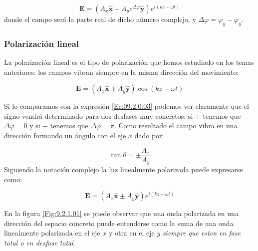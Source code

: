 \documentclass[12pt]{article}
\newcommand{\En}{\mathbf{E}}
\newcommand{\hnx}{\hat{\mathbf{x}}}
\newcommand{\hny}{\hat{\mathbf{y}}}
\numberwithin{equation}{section}
\numberwithin{figure}{section}
\begin{document}
\begin{equation}
\En = ( A_x \hnx +  A_y e^{\Delta \varphi} \hny) e^{i (kz - \omega t)} \label{Ec:09.2.0.03}
\end{equation}
donde el campo será la parte real de dicho número complejo, y $\Delta \varphi = \varphi_y - \varphi_y$.

\subsubsection{Polarización lineal}

La polarización lineal es el tipo de polarización que hemos estudiado en los temas anteriores: los campos vibran siempre en la misma dirección del movimiento:


\begin{equation}
 \En = (A_x \hnx \pm  A_y \hny) \cos (kz-\omega t)
\end{equation}

Si lo comparamos con la expresión \ref{Ec:09.2.0.03} podemos ver claramente que el signo vendrá determinado para dos desfases muy concretos: si $+$ tenemos que $\Delta \varphi = 0$ y si $-$ tenemos que $\Delta \varphi = \pi$. Como resultado el campo vibra en una dirección formando un ángulo con el eje $x$ dado por:

\begin{equation}
\tan \theta = \pm \dfrac{A_x}{A_y}
\end{equation}
Siguiendo la notación complejo la luz linealmente polarizada puede expresarse como:

\begin{equation}
 \En = (A_x \hnx  \pm A_y \hny) e^{i (kz-\omega t)}
\end{equation}

En la figura \ref{Fig:9.2.1.01} se puede observar que una onda polarizada en una dirección del espacio concreto puede entenderse como la suma de una onda linealmente polarizada en el eje $x$ y otra en el eje $y$ \textit{siempre que esten en fase total o en desfase total}.
\end{document}
